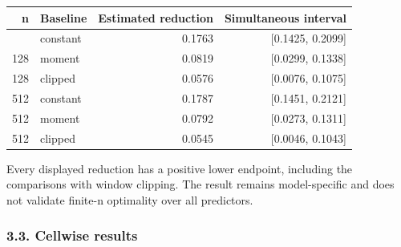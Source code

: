 {\def\LTcaptype{table} %
\begin{longtable}[]{@{}rlrr@{}}
\toprule\noalign{}
n & Baseline & Estimated reduction & Simultaneous interval \\
\midrule\noalign{}
\endhead
\bottomrule\noalign{}
\endlastfoot
128 & constant & 0.1763 & {[}0.1425, 0.2099{]} \\
128 & moment & 0.0819 & {[}0.0299, 0.1338{]} \\
128 & clipped & 0.0576 & {[}0.0076, 0.1075{]} \\
512 & constant & 0.1787 & {[}0.1451, 0.2121{]} \\
512 & moment & 0.0792 & {[}0.0273, 0.1311{]} \\
512 & clipped & 0.0545 & {[}0.0046, 0.1043{]} \\
\end{longtable}
}

Every displayed reduction has a positive lower endpoint, including the
comparisons with window clipping. The result remains model-specific and
does not validate finite-n optimality over all predictors.

\subsubsection{3.3. Cellwise results}\label{confirmation-cellwise-results}

